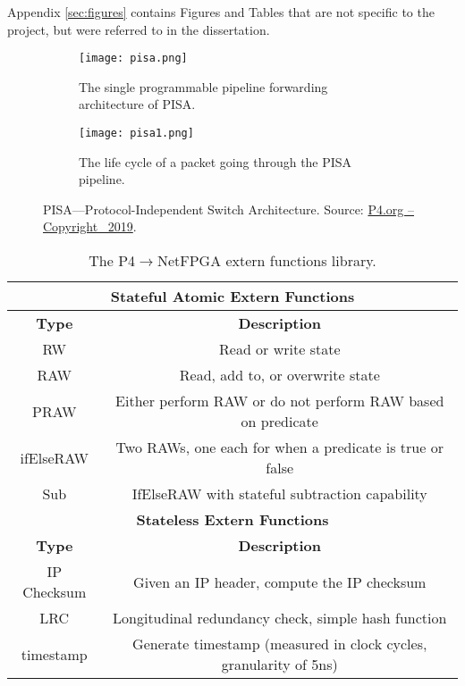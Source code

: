 Appendix \ref{sec:figures} contains Figures and Tables that are not specific to the project, but were referred to in the dissertation.

\begin{figure}[h]
	\centering
	\begin{subfigure}[b]{\textwidth}
		\centering
		\texttt{[image: pisa.png]}
		\caption{The single programmable pipeline forwarding architecture of PISA.}
		\label{fig:pisa}
	\end{subfigure}
	
	\vspace*{5mm}
	
	\begin{subfigure}[b]{\textwidth}
		\centering
		\texttt{[image: pisa1.png]}
		\caption{The life cycle of a packet going through the PISA pipeline.}
		\label{fig:pisa1}
	\end{subfigure}
	\caption{PISA---Protocol-Independent Switch Architecture. Source: \href{https://p4.org}{P4.org -- Copyright \textcopyright\ 2019}.}
\end{figure}

\begin{table}[!ht]
	\begin{center}
		\caption{The P4$\rightarrow$NetFPGA extern functions library.}
		\label{tab:externs}
		\begin{tabular}{ | c | c | }
			\hline
			\multicolumn{2}{|c|}{\textbf{Stateful Atomic Extern Functions}} \\ \hline
			\textbf{Type} & \textbf{Description}  \\ \hline
			RW & Read or write state \\ \hline
			RAW & Read, add to, or overwrite state  \\ \hline
			PRAW & Either perform RAW or do not perform RAW based on predicate \\ \hline
			ifElseRAW & Two RAWs, one each for when a predicate is true or false \\ \hline
			Sub & IfElseRAW with stateful subtraction capability \\ \hline
			
			\multicolumn{2}{|c|}{\textbf{Stateless Extern Functions}} \\ \hline
			\textbf{Type} & \textbf{Description}  \\ \hline
			IP Checksum & Given an IP header, compute the IP checksum \\ \hline
			LRC & Longitudinal redundancy check, simple hash function \\ \hline
			timestamp & Generate timestamp (measured in clock cycles, granularity of 5ns) \\ \hline
		\end{tabular}
	\end{center}
\end{table}


